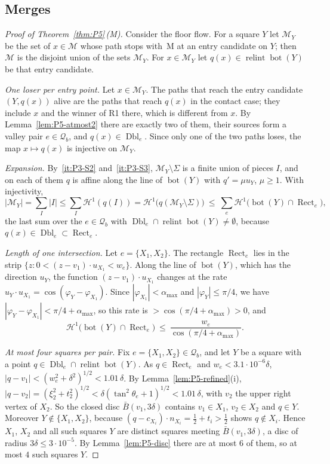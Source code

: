 \documentclass[11pt]{amsart}
\newcommand{\cM}{\mathcal M}
\newcommand{\relint}{\operatorname{relint}}
\newcommand{\Bot}{\operatorname{bot}}
\newcommand{\amax}{\alpha_{\max}}
\theoremstyle{definition}
\theoremstyle{remark}
\numberwithin{equation}{section}
\begin{document}
\subsection{Merges}\label{ssec:P5-M}

\begin{proof}[Proof of Theorem~\ref{thm:P5}\,\textup{(M)}]
Consider the floor flow. For a square $Y$ let $\cM_Y$ be the set of $x\in\cM$ whose path stops with~M at an entry candidate on $Y$; then $\cM$ is the disjoint union of the sets $\cM_Y$. For $x\in\cM_Y$ let $q(x)\in\relint\Bot(Y)$ be that entry candidate.

\emph{One loser per entry point.} Let $x\in\cM_Y$. The paths that reach the entry candidate $(Y,q(x))$ alive are the paths that reach $q(x)$ in the contact case; they include $x$ and the winner of R1 there, which is different from $x$. By Lemma~\ref{lem:P5-atmost2} there are exactly two of them, their sources form a valley pair $e\in\mathcal Q_b$, and $q(x)\in\operatorname{Dbl}_e$. Since only one of the two paths loses, the map $x\mapsto q(x)$ is injective on $\cM_Y$.

\emph{Expansion.} By~\ref{it:P3-S2} and~\ref{it:P3-S3}, $\cM_Y\setminus\Sigma$ is a finite union of pieces $I$, and on each of them $q$ is affine along the line of $\Bot(Y)$ with $q'=\mu u_Y$, $\mu\ge1$. With injectivity,
\[
|\cM_Y|=\sum_I|I|\le\sum_I\mathcal H^1(q(I))=\mathcal H^1\big(q(\cM_Y\setminus\Sigma)\big)\ \le\ \sum_{e}\mathcal H^1\big(\Bot(Y)\cap\operatorname{Rect}_e\big),
\]
the last sum over the $e\in\mathcal Q_b$ with $\operatorname{Dbl}_e\cap\relint\Bot(Y)\ne\emptyset$, because $q(x)\in\operatorname{Dbl}_e\subset\operatorname{Rect}_e$.

\emph{Length of one intersection.} Let $e=\{X_1,X_2\}$. The rectangle $\operatorname{Rect}_e$ lies in the strip $\{z:0<(z-v_1)\cdot u_{X_1}<w_e\}$. Along the line of $\Bot(Y)$, which has the direction $u_Y$, the function $(z-v_1)\cdot u_{X_1}$ changes at the rate $u_Y\cdot u_{X_1}=\cos(\varphi_Y-\varphi_{X_1})$. Since $|\varphi_{X_1}|<\amax$ and $|\varphi_Y|\le\pi/4$, we have $|\varphi_Y-\varphi_{X_1}|<\pi/4+\amax$, so this rate is $>\cos(\pi/4+\amax)>0$, and
\[
\mathcal H^1\big(\Bot(Y)\cap\operatorname{Rect}_e\big)\ \le\ \frac{w_e}{\cos(\pi/4+\amax)} .
\]

\emph{At most four squares per pair.} Fix $e=\{X_1,X_2\}\in\mathcal Q_b$, and let $Y$ be a square with a point $q\in\operatorname{Dbl}_e\cap\relint\Bot(Y)$. As $q\in\operatorname{Rect}_e$ and $w_e<3.1\cdot10^{-6}\delta$, $|q-v_1|<(w_e^2+\delta^2)^{1/2}<1.01\,\delta$. By Lemma~\ref{lem:P5-refined}(i), $|q-v_2|=(\xi_2^2+t_2^2)^{1/2}<\delta(\tan^2\theta_e+1)^{1/2}<1.01\,\delta$, with $v_2$ the upper right vertex of $X_2$. So the closed disc $\bar B(v_1,3\delta)$ contains $v_1\in X_1$, $v_2\in X_2$ and $q\in Y$. Moreover $Y\notin\{X_1,X_2\}$, because $(q-c_{X_i})\cdot n_{X_i}=\frac12+t_i>\frac12$ shows $q\notin X_i$. Hence $X_1$, $X_2$ and all such squares $Y$ are distinct squares meeting $\bar B(v_1,3\delta)$, a disc of radius $3\delta\le3\cdot10^{-5}$. By Lemma~\ref{lem:P5-disc} there are at most $6$ of them, so at most $4$ such squares $Y$.


\end{proof}
\end{document}
